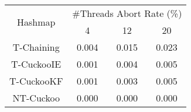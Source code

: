 \begin{tabular}{|c|c|c|c|}
\hline
\multirow{2}{*}{Hashmap} & \multicolumn{3}{c|}{\#Threads Abort Rate (\%)}\\\cline{2-4}& 4 & 12 & 20\\
\hline
\hline
T-Chaining & 0.004 & 0.015 & 0.023\\
T-CuckooIE & 0.001 & 0.004 & 0.005\\
T-CuckooKF & 0.001 & 0.003 & 0.005\\
NT-Cuckoo & 0.000 & 0.000 & 0.000\\
\hline
\end{tabular}
